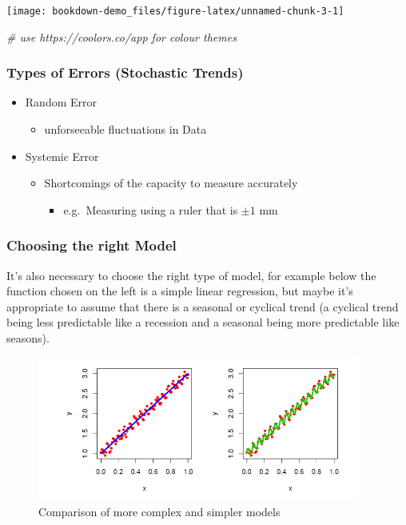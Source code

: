 \documentclass[]{book}
\newenvironment{Shaded}{\begin{snugshade}}{\end{snugshade}}
\newcommand{\CommentTok}[1]{\textcolor[rgb]{0.56,0.35,0.01}{\textit{#1}}}
\providecommand{\tightlist}{%
  \setlength{\itemsep}{0pt}\setlength{\parskip}{0pt}}
\begin{document}
\texttt{[image: bookdown-demo\_files/figure-latex/unnamed-chunk-3-1]}

\begin{Shaded}
\begin{Highlighting}[]
  \CommentTok{# use https://coolors.co/app for colour themes}
\end{Highlighting}
\end{Shaded}

\subsubsection{Types of Errors (Stochastic
Trends)}\label{types-of-errors-stochastic-trends}

\begin{itemize}
\tightlist
\item
  Random Error

  \begin{itemize}
  \tightlist
  \item
    unforseeable fluctuations in Data
  \end{itemize}
\item
  Systemic Error

  \begin{itemize}
  \tightlist
  \item
    Shortcomings of the capacity to measure accurately

    \begin{itemize}
    \tightlist
    \item
      e.g.~Measuring using a ruler that is \(\pm1 \text{ mm}\)
    \end{itemize}
  \end{itemize}
\end{itemize}

\subsubsection{Choosing the right Model}\label{choosing-the-right-model}

It's also necessary to choose the right type of model, for example below
the function chosen on the left is a simple linear regression, but maybe
it's appropriate to assume that there is a seasonal or cyclical trend (a
cyclical trend being less predictable like a recession and a seasonal
being more predictable like seasons).

\begin{figure}
\centering
\includegraphics{images/Cycvsseas400px.jpg}
\caption{Comparison of more complex and simpler models}
\end{figure}
\end{document}

